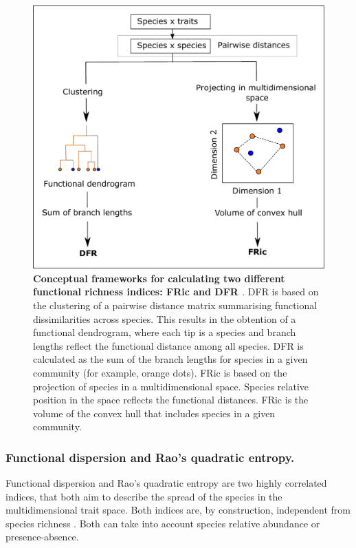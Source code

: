 \begin{figure}[h!]
\centering
\includegraphics[scale=0.5]{figures/chapter3/DFR_FRic_chart}
\caption[Conceptual frameworks for calculating two different functional richness indices: FRic and DFR]{\textbf{Conceptual frameworks for calculating two different functional richness indices: FRic \citep{Villeger2008} and DFR \citep{Petchey2002}}. DFR is based on the clustering of a pairwise distance matrix summarising functional dissimilarities across species. This results in the obtention of a functional dendrogram, where each tip is a species and branch lengths reflect the functional distance among all species. DFR is calculated as the sum of the branch lengths for species in a given community (for example, orange dots). FRic is based on the projection of species in a multidimensional space. Species relative position in the space reflects the functional distances. FRic is the volume of the convex hull that includes species in a given community.} 
\label{chartFR_calc}
\end{figure}


\subsubsection{Functional dispersion and Rao's quadratic entropy.}
Functional dispersion \citep{Laliberte2010} and Rao's quadratic entropy \citep{Rao1982, Botta-Dukat2009} are two highly correlated indices, that both aim to describe the spread of the species in the multidimensional trait space. 
Both indices are, by construction, independent from species richness \citep{Schleuter2010}. Both can take into account species relative abundance or presence-absence.

